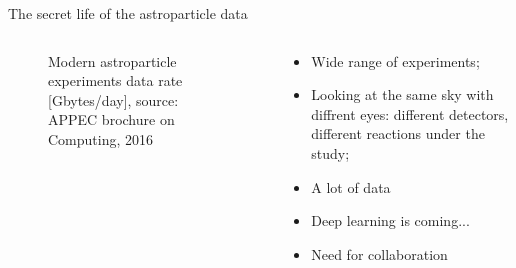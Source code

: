 \documentclass[18pt]{beamer}
\begin{document}
\begin{frame}{The secret life of the astroparticle data}
\small
\begin{columns}

  \begin{column}[t]{0.49\textwidth}
    \begin{figure}[h]
    \vspace{-1em}
    \hspace{-1em}
    \vspace{-1em}
    \caption{\small Modern astroparticle experiments data rate [Gbytes/day], source: APPEC brochure on Computing, 2016}
    \label{ris:image}
    \end{figure}
  \end{column}
  \hfill
  \begin{column}[t]{0.49\textwidth}
    \begin{itemize}
    \item Wide range of experiments;
    \item Looking at the same sky with diffrent eyes: different detectors, different reactions under the study;
    \item A lot of data
    \item Deep learning is coming...
    \item Need for collaboration
    \end{itemize}


\end{column}
\end{columns}
\end{frame}
\end{document}
